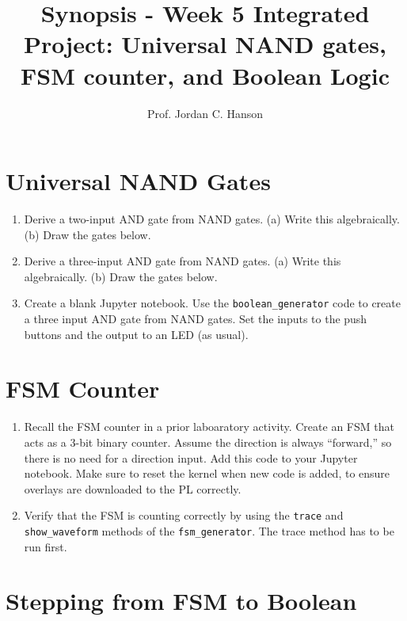 \documentclass{article}
\begin{document}
\title{Synopsis - Week 5 Integrated Project: Universal NAND gates, FSM counter, and Boolean Logic}
\author{Prof. Jordan C. Hanson}

\maketitle

\section{Universal NAND Gates}

\begin{enumerate}
\item Derive a two-input AND gate from NAND gates.  (a) Write this algebraically.  (b) Draw the gates below. \\ \vspace{1.25cm}
\item Derive a three-input AND gate from NAND gates.  (a) Write this algebraically.  (b) Draw the gates below. \\ \vspace{1.25cm}
\item Create a blank Jupyter notebook.  Use the \verb+boolean_generator+ code to create a three input AND gate from NAND gates.  Set the inputs to the push buttons and the output to an LED (as usual).
\end{enumerate}

\section{FSM Counter}

\begin{enumerate}
\item Recall the FSM counter in a prior laboaratory activity.  Create an FSM that acts as a 3-bit binary counter.  Assume the direction is always ``forward,'' so there is no need for a direction input.  Add this code to your Jupyter notebook.  Make sure to reset the kernel when new code is added, to ensure overlays are downloaded to the PL correctly.
\item Verify that the FSM is counting correctly by using the \verb+trace+ and \verb+show_waveform+ methods of the \verb+fsm_generator+.  The trace method has to be run first.
\end{enumerate}

\section{Stepping from FSM to Boolean}
\end{document}
